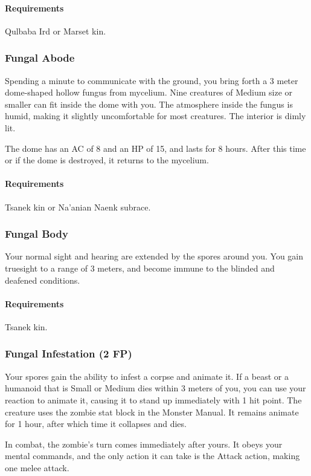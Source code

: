    \paragraph{Requirements} Qulbaba Ird or Marset kin.
\subsubsection{Fungal Abode} \label{feat::fungalabode}
    Spending a minute to communicate with the ground, you bring forth a 3 meter dome-shaped hollow fungus from mycelium.
    Nine creatures of Medium size or smaller can fit inside the dome with you.
    The atmosphere inside the fungus is humid, making it slightly uncomfortable for most creatures.
    The interior is dimly lit.

    The dome has an AC of 8 and an HP of 15, and lasts for 8 hours.
    After this time or if the dome is destroyed, it returns to the mycelium.
    \paragraph{Requirements} Tsanek kin or Na'anian Naenk subrace.
\subsubsection{Fungal Body} \label{feat::fungalbody}
    Your normal sight and hearing are extended by the spores around you.
    You gain truesight to a range of 3 meters, and become immune to the blinded and deafened conditions.
    \paragraph{Requirements} Tsanek kin.
\subsubsection{Fungal Infestation (2 FP)} \label{feat::fungalinfestation}
    Your spores gain the ability to infest a corpse and animate it.
    If a beast or a humanoid that is Small or Medium dies within 3 meters of you, you can use your reaction to animate it, causing it to stand up immediately with 1 hit point.
    The creature uses the zombie stat block in the Monster Manual.
    It remains animate for 1 hour, after which time it collapses and dies.

    In combat, the zombie's turn comes immediately after yours.
    It obeys your mental commands, and the only action it can take is the Attack action, making one melee attack.

